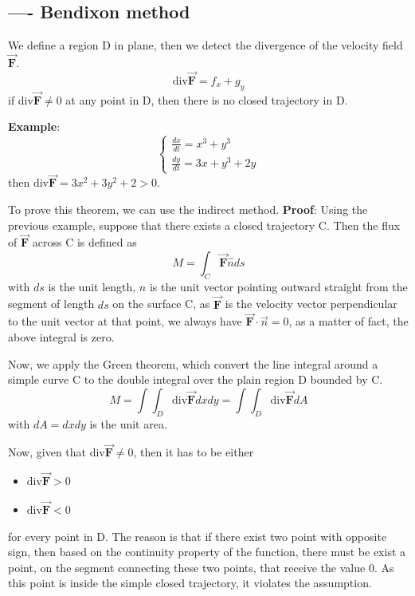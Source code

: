 \subsection{---- Bendixon method}
\label{sec:bendixon-method}

We define a region D in plane, then we detect the divergence of the
velocity field $\overrightarrow{\mathbf{F}}$.
\begin{equation}
  \label{eq:584}
  \text{div}\overrightarrow{\mathbf{F}} = f_x + g_y
\end{equation}
if div$\overrightarrow{\mathbf{F}} \ne 0$ at any point in D, then
there is no closed trajectory in D.

{\bf Example}:
\begin{equation}
  \label{eq:585}
  \left\{
    \begin{array}{cc}
      \frac{dx}{dt} = x^3 + y^3\\
      \frac{dy}{dt} = 3x+y^3 + 2y
    \end{array}
  \right.
\end{equation}
then $\text{div}\overrightarrow{\mathbf{F}} = 3x^2+3y^2+2 >
0$. 

To prove this theorem, we can use the indirect method. {\bf Proof}:
Using the previous example, suppose that there exists a closed
trajectory C. Then the flux of $\overrightarrow{\mathbf{F}}$ across C
is defined as
\begin{equation}
  \label{eq:586}
  M = \int_C \overrightarrow{\mathbf{F}}\dot \hat{n} ds
\end{equation}
with $ds$ is the unit length, $n$ is the unit vector pointing outward
straight from the segment of length $ds$ on the surface C, as
$\overrightarrow{\mathbf{F}}$ is the velocity vector perpendicular to
the unit vector at that point, we always have
$\overrightarrow{\mathbf{F}}\cdot \overrightarrow{n}=0$, as a matter of
fact, the above integral is zero.

Now, we apply the Green theorem, which convert the line integral
around a simple curve C to the double integral over the plain region D
bounded by C.
\begin{equation}
  \label{eq:587}
  M =  \int\int_D \text{div}\overrightarrow{\mathbf{F}}dxdy =  \int\int_D \text{div}\overrightarrow{\mathbf{F}}dA
\end{equation}
with $dA = dxdy$ is the unit area. 

Now, given that $\text{div}\overrightarrow{\mathbf{F}} \ne 0$, then it
has to be either 
\begin{itemize}
\item $\text{div}\overrightarrow{\mathbf{F}} > 0$
\item $\text{div}\overrightarrow{\mathbf{F}} < 0$
\end{itemize}
for every point in D. The reason is that if there exist two point with
opposite sign, then based on the continuity property of the function,
there must be exist a point, on the segment connecting these two
points, that receive the value 0. As this point is inside the simple
closed trajectory, it violates the assumption. 

